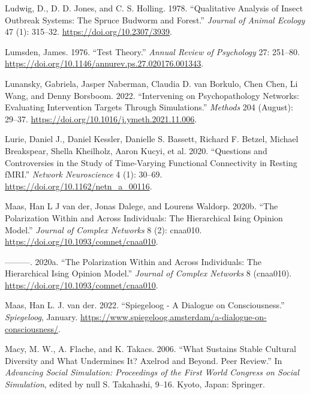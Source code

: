 \documentclass[
  a4paper,
  DIV=11,
  numbers=noendperiod,
  oneside]{scrreprt}
\newlength{\cslhangindent}
\newlength{\cslentryspacingunit} %
\newenvironment{CSLReferences}[2] %
 {%
  \setlength{\parindent}{0pt}
  \ifodd #1
  \let\oldpar\par
  \def\par{\hangindent=\cslhangindent\oldpar}
  \fi
  \setlength{\parskip}{#2\cslentryspacingunit}
 }%
 {}
\begin{document}
\begin{CSLReferences}{1}{0}
\leavevmode{}%
Ludwig, D., D. D. Jones, and C. S. Holling. 1978. {``Qualitative
Analysis of Insect Outbreak Systems: The Spruce Budworm and Forest.''}
\emph{Journal of Animal Ecology} 47 (1): 315--32.
\url{https://doi.org/10.2307/3939}.

\leavevmode{}%
Lumsden, James. 1976. {``Test Theory.''} \emph{Annual Review of
Psychology} 27: 251--80.
\url{https://doi.org/10.1146/annurev.ps.27.020176.001343}.

\leavevmode{}%
Lunansky, Gabriela, Jasper Naberman, Claudia D. van Borkulo, Chen Chen,
Li Wang, and Denny Borsboom. 2022. {``Intervening on Psychopathology
Networks: {Evaluating} Intervention Targets Through Simulations.''}
\emph{Methods} 204 (August): 29--37.
\url{https://doi.org/10.1016/j.ymeth.2021.11.006}.

\leavevmode{}%
Lurie, Daniel J., Daniel Kessler, Danielle S. Bassett, Richard F.
Betzel, Michael Breakspear, Shella Kheilholz, Aaron Kucyi, et al. 2020.
{``Questions and Controversies in the Study of Time-Varying Functional
Connectivity in Resting {fMRI}.''} \emph{Network Neuroscience} 4 (1):
30--69. \url{https://doi.org/10.1162/netn_a_00116}.

\leavevmode{}%
Maas, Han L J van der, Jonas Dalege, and Lourens Waldorp. 2020b. {``The
Polarization Within and Across Individuals: The Hierarchical Ising
Opinion Model.''} \emph{Journal of Complex Networks} 8 (2): cnaa010.
\url{https://doi.org/10.1093/comnet/cnaa010}.

\leavevmode{}%
---------. 2020a. {``The Polarization Within and Across Individuals: The
Hierarchical Ising Opinion Model.''} \emph{Journal of Complex Networks}
8 (cnaa010). \url{https://doi.org/10.1093/comnet/cnaa010}.

\leavevmode{}%
Maas, Han L. J. van der. 2022. {``Spiegeloog - A Dialogue on
Consciousness.''} \emph{Spiegeloog}, January.
\url{https://www.spiegeloog.amsterdam/a-dialogue-on-consciousness/}.

\leavevmode{}%
Macy, M. W., A. Flache, and K. Takacs. 2006. {``What {Sustains Stable
Cultural Diversity} and {What Undermines It}? {Axelrod} and Beyond.
{Peer} Review.''} In \emph{Advancing {Social Simulation}: {Proceedings}
of the {First World Congress} on {Social Simulation}}, edited by null S.
Takahashi, 9--16. {Kyoto, Japan}: {Springer}.


\end{CSLReferences}
\end{document}
